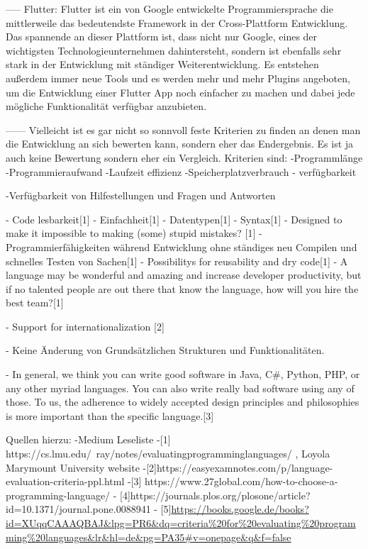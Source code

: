 -----
Flutter:
Flutter ist ein von Google entwickelte Programmiersprache die mittlerweile das bedeutendste Framework in der Cross-Plattform Entwicklung. Das spannende an dieser Plattform ist, dass nicht nur Google, eines der wichtigsten Technologieunternehmen dahintersteht, sondern ist ebenfalls sehr stark in der Entwicklung mit ständiger Weiterentwicklung. Es entstehen außerdem immer neue Tools und es werden mehr und mehr Plugins angeboten, um die Entwicklung einer Flutter App noch einfacher zu machen und dabei jede mögliche Funktionalität verfügbar anzubieten.

------
Vielleicht ist es gar nicht so sonnvoll feste Kriterien zu finden an denen man die Entwicklung an sich bewerten kann, sondern eher das Endergebnis. Es ist ja auch keine Bewertung sondern eher ein Vergleich.
Kriterien sind:
-Programmlänge
-Programmieraufwand
-Laufzeit effizienz
-Speicherplatzverbrauch
- verfügbarkeit

-Verfügbarkeit von Hilfestellungen und Fragen und Antworten

- Code lesbarkeit[1]
- Einfachheit[1]
- Datentypen[1]
- Syntax[1]
- Designed to make it impossible to making (some) stupid mistakes? [1]
- Programmierfähigkeiten während Entwicklung ohne ständiges neu Compilen und schnelles Testen     von Sachen[1]
- Possibilitys for reusability and dry code[1]
- A language may be wonderful and amazing and increase developer productivity, but if no talented people are out there that know the language, how will you hire the best team?[1]

- Support for internationalization [2]

- Keine Änderung von Grundsätzlichen Strukturen und Funktionalitäten.

- In general, we think you can write good software in Java, C\#, Python, PHP, or any other myriad languages. You can also write really bad software using any of those. To us, the adherence to widely accepted design principles and philosophies is more important than the specific language.[3]



Quellen hierzu:
-Medium Leseliste
-[1] https://cs.lmu.edu/~ray/notes/evaluatingprogramminglanguages/  , Loyola Marymount University website
-[2]https://easyexamnotes.com/p/language-evaluation-criteria-ppl.html
-[3] https://www.27global.com/how-to-choose-a-programming-language/
- [4]https://journals.plos.org/plosone/article?id=10.1371/journal.pone.0088941
- [5]\url{https://books.google.de/books?id=XUqqCAAAQBAJ&lpg=PR6&dq=criteria%20for%20evaluating%20programming%20languages&lr&hl=de&pg=PA35#v=onepage&q&f=false}

